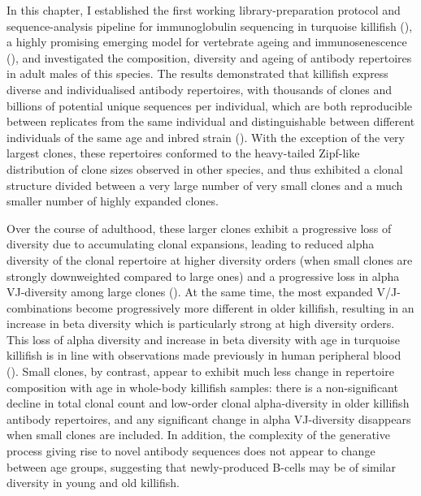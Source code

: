In this chapter, I established the first working library-preparation protocol and sequence-analysis pipeline for immunoglobulin sequencing in turquoise killifish (\nfu), a highly promising emerging model for vertebrate ageing and immunosenescence (), and investigated the composition, diversity and ageing of  antibody repertoires in adult males of this species. The results demonstrated that killifish express diverse and individualised antibody repertoires, with thousands of clones and billions of potential unique sequences per individual, which are both reproducible between replicates from the same individual and distinguishable between different individuals of the same age and inbred strain (). With the exception of the very largest clones, these repertoires conformed to the heavy-tailed Zipf-like distribution of clone sizes observed in other species, and thus exhibited a clonal structure divided between a very large number of very small clones and a much smaller number of highly expanded clones.

Over the course of adulthood, these larger clones exhibit a progressive loss of diversity due to accumulating clonal expansions, leading to reduced alpha diversity of the clonal repertoire at higher diversity orders (when small clones are strongly downweighted compared to large ones) and a progressive loss in alpha VJ-diversity among large clones (). At the same time, the most expanded V/J-combinations become progressively more different in older killifish, resulting in an increase in beta diversity which is particularly strong at high diversity orders. This loss of alpha diversity and increase in beta diversity with age in turquoise killifish is in line with observations made previously in human peripheral blood (). Small clones, by contrast, appear to exhibit much less change in repertoire composition with age in whole-body killifish samples: there is a non-significant decline in total clonal count and low-order clonal alpha-diversity in older killifish antibody repertoires, and any significant change in alpha VJ-diversity disappears when small clones are included. In addition, the complexity of the generative process giving rise to novel antibody sequences does not appear to change between age groups, suggesting that newly-produced \naive B-cells may be of similar diversity in young and old killifish.

